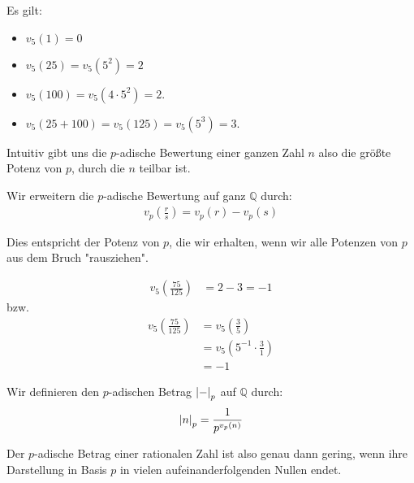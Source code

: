 \documentclass{report}
\newcommand*{\newpar}{\par\vspace{\baselineskip}\noindent}
\newcommand{\bQ}{\mathbb{Q}}
\begin{document}
	\begin{example}
		Es gilt:
		\begin{itemize}
			\item $v_5(1) = 0$
			\item $v_5(25) = v_5(5^2) = 2$
			\item $v_5(100) = v_5(4 \cdot 5^2) = 2$.
			\item $v_5(25 + 100) = v_5(125) = v_5(5^3) = 3$.
		\end{itemize} 
	\end{example}
	\noindent Intuitiv gibt uns die $p$-adische Bewertung einer ganzen Zahl $n$ also die größte Potenz von $p$, durch die $n$ teilbar ist.
	\newpar
	\iffalse
	Die $p$-adische Bewertung ist das Standardbeispiel einer Bewertung. Es existieren viele andere wichtige Bewertungen in der kommutativen Algebra, in der komplexen Analysis und in der algebraischen Geometrie, diese sind allerdings in der Regel leider nichttrivial und würden den Rahmen dieses Proseminarvortrags sprengen.\\
	\fi
	\begin{definition}
		Wir erweitern die $p$-adische Bewertung auf ganz $\bQ$ durch:
		\begin{align*}
			v_p\left(\frac{r}{s}\right) = v_p(r) - v_p(s)
		\end{align*}
	\end{definition}
	\noindent Dies entspricht der Potenz von $p$, die wir erhalten, wenn wir alle Potenzen von $p$ aus dem Bruch "rausziehen".
	\begin{example}
		\begin{align*}
			v_5\left(\frac{75}{125}\right) &= 2 - 3 = -1
		\end{align*}
		bzw.
		\begin{align*}
			v_5\left(\frac{75}{125}\right) &= v_5\left(\frac{3}{5}\right)\\ &= v_5\left(5^{-1} \cdot \frac{3}{1}\right)\\
			&= -1
		\end{align*}
	\end{example}
	\begin{definition}
		Wir definieren den $p$-adischen Betrag $\abs{-}_p$ auf $\bQ$ durch:
		\begin{align*} 
			\abs{n}_p = \frac{1}{p^{v_p(n)}}
		\end{align*}
	\end{definition}
	\noindent Der $p$-adische Betrag einer rationalen Zahl ist also genau dann gering, wenn ihre Darstellung in Basis $p$ in vielen aufeinanderfolgenden Nullen endet.
\end{document}
